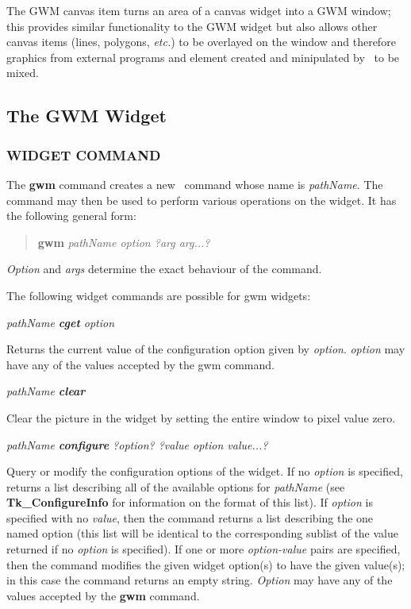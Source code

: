 The GWM canvas item turns an area of a canvas widget into a GWM window;
this provides similar functionality to the GWM widget but also allows
other canvas items (lines, polygons, {\em{etc.}}) to be overlayed on
the window and therefore graphics from external programs and element
created and minipulated by \Tk\ to be mixed.

\subsection{\label{gwm_widget}The GWM Widget}

\subsubsection{WIDGET COMMAND}

The {\bf{gwm}} command creates a new \Tcl\ command whose name is
{\em{pathName}}.  The command may then be used to perform various
operations on the widget. It has the following general form:

\begin{quote}
{\bf gwm} {\em pathName option ?arg arg...?}
\end{quote}

{\em{Option}} and {\em{args}} determine the exact behaviour of the command.

The following widget commands are possible for gwm widgets:

{\em pathName {\bf cget} option}
\begin{rquote}
Returns the current value of the configuration option given by {\em option}.
{\em option} may have any of the values accepted by the gwm command.
\end{rquote}

{\em pathName {\bf clear}}
\begin{rquote}
Clear the picture in the widget by setting the entire window to pixel
value zero.
\end{rquote}

{\em pathName {\bf configure} ?option? ?value option value...?}
\begin{rquote}
Query or modify the configuration options of the widget.
If no {\em{option}} is specified, returns a list describing all of
the available options for {\em{pathName}} (see {\bf{Tk\_ConfigureInfo}} for
information on the format of this list).  If {\em option} is specified
with no {\em value}, then the command returns a list describing the
one named option (this list will be identical to the corresponding
sublist of the value returned if no {\em option} is specified).  If
one or more {\em option-value} pairs are specified, then the command
modifies the given widget option(s) to have the given value(s);  in
this case the command returns an empty string.
{\em Option} may have any of the values accepted by the {\bf gwm}
command.
\end{rquote}


